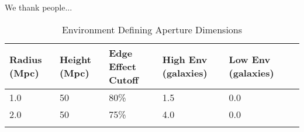 \documentclass{emulateapj}
\begin{document}
We thank people...
%
%


\appendix
\begin{table*} %
  \caption{Environment Defining Aperture Dimensions}
  \label{tab:aperture}
  \begin{center}
    \leavevmode
    \begin{tabular}{llllll} \hline \hline              
  Radius (Mpc)          &Height (Mpc)      & Edge Effect Cutoff &High Env (galaxies) &Low Env (galaxies) \\ \hline 
  1.0 &50 & 80\% & 1.5 & 0.0          \\
  2.0 &50 & 75\% & 4.0 & 0.0          \\ \hline
  \multicolumn{5}{l}{}                                             \\       
    \end{tabular}
  \end{center}
\end{table*}
\end{document}
